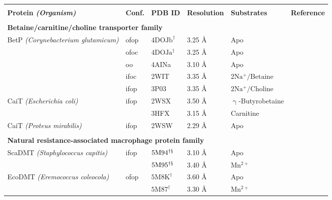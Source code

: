 


\begin{center}
\begin{tabular}{l l l l l r}
\toprule \\
\textbf{Protein \emph{(Organism)}} & \textbf{Conf.} & \textbf{PDB ID} & \textbf{Resolution} & \textbf{Substrates} & \textbf{Reference} \\
\midrule \\
\multicolumn{5}{l}{\textbf{Betaine/carnitine/choline transporter family}} \\
BetP \emph{(Corynebacterium glutamicum)} & \gls{ofop} & $\mathrm{4DOJb^{\dagger}}$ & 3.25 \AA &Apo & \citep*{Perez2012} \\
& \gls{ofoc} & $\mathrm{4DOJa^{\dagger}}$ & 3.25 \AA & Apo & \citep*{Perez2012} \\
& \gls{oo} & 4AINa & 3.10 \AA & Apo & \citep*{Perez2012} \\
& \gls{ifoc} & 2WIT & 3.35 \AA & $\mathrm{2Na^+/Betaine}$ & \citep*{Ressl2009} \\
& \gls{ifop} & 3P03 & 3.35 \AA & $\mathrm{2Na^+/Choline}$ & \citep*{Perez2011} \\
CaiT \emph{(Escherichia coli)} & \gls{ifop} & 2WSX & 3.50 \AA & $\mathrm{\upgamma}$-Butyrobetaine & \citep*{Schulze2010} \\
& & 3HFX & 3.15 \AA & Carnitine & \citep*{Tang2010} \\
CaiT \emph{(Proteus mirabilis)} & \gls{ifop} & 2WSW & 2.29 \AA & Apo & \citep*{Schulze2010} \\
\\
\multicolumn{5}{l}{\textbf{Natural resistance-associated macrophage protein family}} \\
ScaDMT \emph{(Staphylococcus capitis)} & \gls{ifop} & $\mathrm{5M94^{\dagger \mathsection}}$ & 3.10 \AA & Apo & \citep*{Ehrnstorfer2014} \\ 
& & $\mathrm{5M95^{\dagger \mathsection}}$ & 3.40 \AA & $\mathrm{Mn^{2+}}$ & \citep*{Ehrnstorfer2014} \\ 
EcoDMT \emph{(Eremococcus coleocola)} & \gls{ofop} & $\mathrm{5M8K}^{\dagger}$ & 3.60 \AA & Apo & \citep*{Ehrnstorfer2017} \\
& & $\mathrm{5M87}^{\dagger}$ & 3.30 \AA & $\mathrm{Mn^{2+}}$ & \citep*{Ehrnstorfer2017} \\

\end{tabular}
\end{center}
